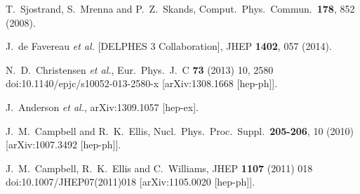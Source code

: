 \documentclass[11pt]{article}
\begin{document}
\begin{thebibliography}{99}
  T.~Sjostrand, S.~Mrenna and P.~Z.~Skands,
  Comput.\ Phys.\ Commun.\  {\bf 178}, 852 (2008).
  
  J.~de Favereau {\it et al.} [DELPHES 3 Collaboration],
  JHEP {\bf 1402}, 057 (2014).
  
  N.~D.~Christensen {\it et al.},
  Eur.\ Phys.\ J.\ C {\bf 73} (2013) 10,  2580
  doi:10.1140/epjc/s10052-013-2580-x
  [arXiv:1308.1668 [hep-ph]].


  
  J.~Anderson {\it et al.},
  arXiv:1309.1057 [hep-ex].
  
  J.~M.~Campbell and R.~K.~Ellis,
  Nucl.\ Phys.\ Proc.\ Suppl.\  {\bf 205-206}, 10 (2010)
  [arXiv:1007.3492 [hep-ph]].
  
  J.~M.~Campbell, R.~K.~Ellis and C.~Williams,
  JHEP {\bf 1107} (2011) 018
  doi:10.1007/JHEP07(2011)018
  [arXiv:1105.0020 [hep-ph]].


\end{thebibliography}
\end{document}
